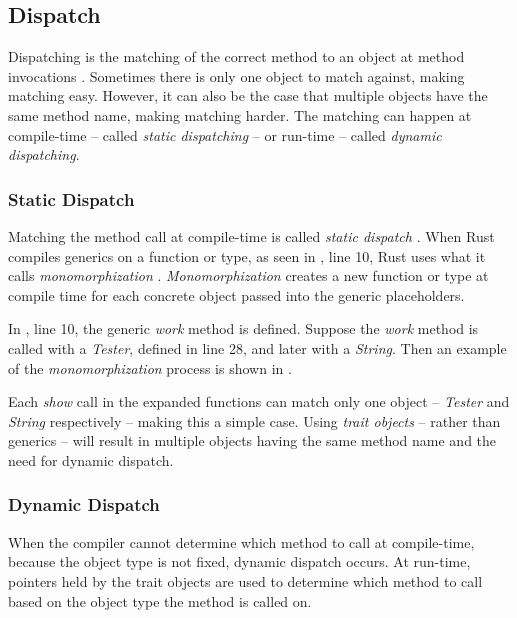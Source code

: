 \subsection{Dispatch}
Dispatching is the matching of the correct method to an object at method invocations \cite{driesen_95_01}.
Sometimes there is only one object to match against, making matching easy.
However, it can also be the case that multiple objects have the same method name, making matching harder.
The matching can happen at compile-time -- called \textit{static dispatching} -- or run-time -- called \textit{dynamic dispatching}.

\subsubsection{Static Dispatch}
Matching the method call at compile-time is called \textit{static dispatch} \cite{klabnik_2019_01, alexandrescu_01_01, abadi_12_01}.
When Rust compiles generics on a function or type, as seen in , line 10, Rust uses what it calls \textit{monomorphization} \cite{klabnik_2019_01}.
\textit{Monomorphization} creates a new function or type at compile time for each concrete object passed into the generic placeholders.

In , line 10, the generic \textit{work} method is defined.
Suppose the \textit{work} method is called with a \textit{Tester}, defined in line 28, and later with a \textit{String}.
Then an example of the \textit{monomorphization} process is shown in .


Each \textit{show} call in the expanded functions can match only one object -- \textit{Tester} and \textit{String} respectively -- making this a simple case.
Using \textit{trait objects} -- rather than generics -- will result in multiple objects having the same method name and the need for dynamic dispatch.

\subsubsection{Dynamic Dispatch}
When the compiler cannot determine which method to call at compile-time, because the object type is not fixed, dynamic dispatch \cite{alexandrescu_01_01, klabnik_2019_01, abadi_12_01} occurs.
At run-time, pointers held by the trait objects are used to determine which method to call \cite{klabnik_2019_01} based on the object type the method is called on.

